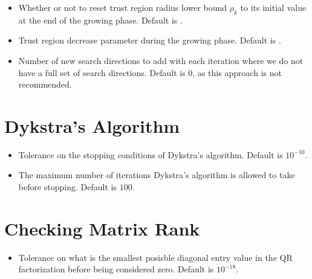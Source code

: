 \documentclass[letterpaper,10pt,english]{sphinxmanual}
\begin{document}
\begin{itemize}
\item {} 
\sphinxAtStartPar
{} \sphinxhyphen{} Whether or not to reset trust region radius lower bound \(\rho_k\) to its initial value at the end of the growing phase. Default is .

\item {} 
\sphinxAtStartPar
{} \sphinxhyphen{} Trust region decrease parameter during the growing phase. Default is .

\item {} 
\sphinxAtStartPar
{} \sphinxhyphen{} Number of new search directions to add with each iteration where we do not have a full set of search directions. Default is 0, as this approach is not recommended.

\end{itemize}


\section{Dykstra’s Algorithm}
\label{\detokenize{advanced:dykstra-s-algorithm}}\begin{itemize}
\item {} 
\sphinxAtStartPar
{} \sphinxhyphen{} Tolerance on the stopping conditions of Dykstra’s algorithm. Default is \(10^{-10}\).

\item {} 
\sphinxAtStartPar
{} \sphinxhyphen{} The maximum number of iterations Dykstra’s algorithm is allowed to take before stopping. Default is \(100\).

\end{itemize}


\section{Checking Matrix Rank}
\label{\detokenize{advanced:checking-matrix-rank}}\begin{itemize}
\item {} 
\sphinxAtStartPar
{} \sphinxhyphen{} Tolerance on what is the smallest posisble diagonal entry value in the QR factorization before being considered zero. Default is \(10^{-18}\).

\end{itemize}
\end{document}
